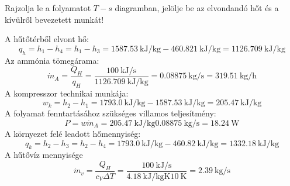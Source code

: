 \vspace{2mm}

Rajzolja le a folyamatot $T-s$ diagramban, jelölje be az elvondandó hőt és a kívülről bevezetett munkát! \vspace{2mm}

A hűtőtérből elvont hő:
\begin{equation}
q_h=h_1-h_4=h_1-h_3=\SI{1587.53}{\kilo\joule\per\kilo\gram}-\SI{460.821}{\kilo\joule\per\kilo\gram} = \SI{1126.709}{\kilo\joule\per\kilo\gram}
\end{equation}
Az ammónia tömegárama:
\begin{equation}
\dot{m}_A=\frac{Q_H}{q_H}=\frac{\SI{100}{\kilo\joule\per\second}}{\SI{1126.709}{\kilo\joule\per\kilo\gram}}=\SI{0.08875}{\kilo\gram\per\second}=\SI{319.51}{\kilo\gram\per\hour}
\end{equation}
A kompresszor technikai munkája:
\begin{equation}
w_k=h_2-h_1=\SI{1793.0}{\kilo\joule\per\kilo\gram}-\SI{1587.53}{\kilo\joule\per\kilo\gram}=\SI{205.47}{\kilo\joule\per\kilo\gram}
\end{equation}
A folyamat fenntartásához szükséges villamos teljesítmény:
\begin{equation}
P=w\dot{m}_A=\SI{205.47}{\kilo\joule\per\kilo\gram}\SI{0.08875}{\kilo\gram\per\second}=\SI{18.24}{\watt}
\end{equation}
A környezet felé leadott hőmennyiség:
\begin{equation}
q_k=h_2-h_3=h_2-h_4=\SI{1793.0}{\kilo\joule\per\kilo\gram}-\SI{460.82}{\kilo\joule\per\kilo\gram}=\SI{1332.18}{\kilo\joule\per\kilo\gram}
\end{equation}
A hűtővíz mennyisége
\begin{equation}
\dot{m}_v=\frac{Q_H}{c_V\Delta T} = \frac{\SI{100}{\kilo\joule\per\second}}{\SI{4.18}{\kilo\joule\per\kilo\gram\kelvin}\SI{10}{\kelvin}}=\SI{2.39}{\kilo\gram\per\second}
\end{equation}
